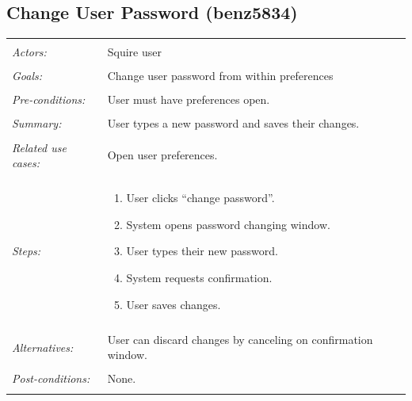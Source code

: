 \documentclass[11pt]{report}
\begin{document}
\subsection{Change User Password (benz5834)}
\begin{tabular}{ p{2cm} p{12cm} }
 \hline
 \\
 \textit{Actors:} & Squire user \\ 
 \\
 \textit{Goals:} & Change user password from within preferences \\
 \\
 \textit{Pre-conditions:} & User must have preferences open. \\
 \\
 \textit{Summary:} & User types a new password and saves their changes.  \\ 
 \\
 \textit{Related use cases:} & Open user preferences. \\ 
 \\
 \textit{Steps:} & \begin{enumerate}
  \item User clicks “change password”.
  \item System opens password changing window.
  \item User types their new password.
  \item System requests confirmation.
  \item User saves changes.
 \end{enumerate} \\
 \\
 \textit{Alternatives:} & User can discard changes by canceling on confirmation window. \\
 \\
 \textit{Post-conditions:} & None. \\
 \\
\hline
\end{tabular}
\end{document}
